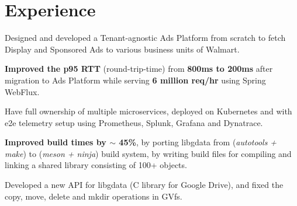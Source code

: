 \documentclass[a4paper]{deedy-resume-reversed}
\begin{document}
\begin{minipage}[t]{0.60\textwidth}


\section{Experience}
\vspace{10pt} %
\begin{tightemize}
\item Designed and developed a Tenant-agnostic Ads Platform from scratch to fetch Display and Sponsored Ads to various business units of Walmart.
\item \textbf{Improved the p95 RTT} (round-trip-time) from \textbf{800ms to 200ms} after migration to Ads Platform while serving \textbf{6 million req/hr} using Spring WebFlux.
\item Have full ownership of multiple microservices, deployed on Kubernetes and with e2e telemetry setup using Prometheus, Splunk, Grafana and Dynatrace.
\end{tightemize}
\sectionsep

\begin{tightemize}
    \item \textbf{Improved build times by $\sim$ 45\%}, by porting libgdata from (\textit{autotools + make}) to (\textit{meson + ninja}) build system, by writing build files for compiling and linking a shared library consisting of 100+ objects.
    \item Developed a new API for libgdata (C library for Google Drive), and fixed the copy, move, delete and mkdir operations in GVfs.
\end{tightemize}
\sectionsep


\end{minipage}
\end{document}

